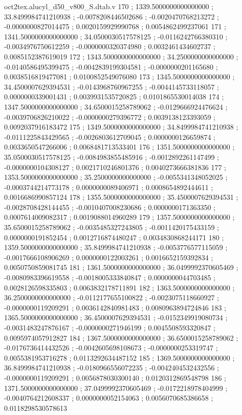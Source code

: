 \begin{filecontents}[overwrite]{oct2tex.alucyl_d50_v800_S.dtab.v}
170 ; 1339.5000000000000000 ; 33.8499984741210938 ; -0.0078208446502686 ; -0.0020470768213272 ; -0.0000000827014475 ; 0.0020159929990768 ; 0.0054862499237061
171 ; 1341.5000000000000000 ; 34.0500030517578125 ; -0.0116242766380310 ; -0.0034976750612259 ; -0.0000000320374980 ; 0.0032461434602737 ; 0.0085152387619019
172 ; 1343.5000000000000000 ; 34.2500000000000000 ; -0.0140586495399475 ; -0.0042839199304581 ; -0.0000000201165680 ; 0.0038516819477081 ; 0.0100852549076080
173 ; 1345.5000000000000000 ; 34.4500007629394531 ; -0.0143968760967255 ; -0.0044145733118057 ; 0.0000000339001431 ; 0.0039931535720825 ; 0.0101865530014038
174 ; 1347.5000000000000000 ; 34.6500015258789062 ; -0.0129666924476624 ; -0.0039706826210022 ; -0.0000000279396772 ; 0.0039138123393059 ; 0.0092037916183472
175 ; 1349.5000000000000000 ; 34.8499984741210938 ; -0.0111225843429565 ; -0.0026803612709045 ; 0.0000000126659874 ; 0.0033650547266006 ; 0.0068481713533401
176 ; 1351.5000000000000000 ; 35.0500030517578125 ; -0.0084983855485916 ; -0.0012892261147499 ; -0.0000000104308127 ; 0.0021710246801376 ; 0.0040273666381836
177 ; 1353.5000000000000000 ; 35.2500000000000000 ; -0.0055341348052025 ; -0.0003744214773178 ; 0.0000000089406971 ; 0.0008654892444611 ; 0.0016686990857124
178 ; 1355.5000000000000000 ; 35.4500007629394531 ; -0.0028708428144455 ; -0.0010407008230686 ; 0.0000000171363350 ; 0.0007614009082317 ; 0.0019088014960289
179 ; 1357.5000000000000000 ; 35.6500015258789062 ; -0.0035485327243805 ; -0.0011420175433159 ; 0.0000000191852454 ; 0.0012716874480247 ; 0.0034830868244171
180 ; 1359.5000000000000000 ; 35.8499984741210938 ; -0.0053776577115059 ; -0.0017666108906269 ; 0.0000000122003261 ; 0.0016652159392834 ; 0.0050750859081745
181 ; 1361.5000000000000000 ; 36.0499992370605469 ; -0.0080983396619558 ; -0.0018005333840847 ; 0.0000000044703485 ; 0.0028126598335803 ; 0.0063832178711891
182 ; 1363.5000000000000000 ; 36.2500000000000000 ; -0.0112177655100822 ; -0.0023075118660927 ; -0.0000000119209291 ; 0.0036142840981483 ; 0.0080963894724846
183 ; 1365.5000000000000000 ; 36.4500007629394531 ; -0.0152349919080734 ; -0.0031483247876167 ; -0.0000000271946199 ; 0.0045508593320847 ; 0.0095974057912827
184 ; 1367.5000000000000000 ; 36.6500015258789062 ; -0.0176736414432526 ; -0.0042605698108673 ; -0.0000000253319747 ; 0.0055381953716278 ; 0.0113292634487152
185 ; 1369.5000000000000000 ; 36.8499984741210938 ; -0.0180966556072235 ; -0.0042404532432556 ; -0.0000000119209291 ; 0.0056878030300140 ; 0.0120312869548798
186 ; 1371.5000000000000000 ; 37.0499992370605469 ; -0.0172218978404999 ; -0.0040764212608337 ; 0.0000000052154063 ; 0.0056070685386658 ; 0.0118298530578613

\end{filecontents}
